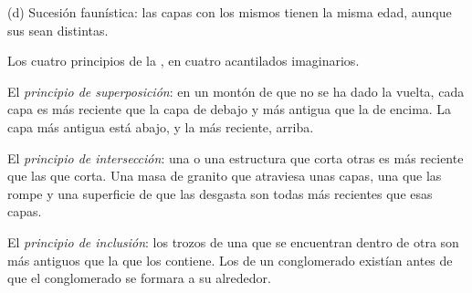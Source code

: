 \begin{omfigure}
\begin{minipage}[t]{0.49\linewidth}
{\small (d) Sucesión faunística: las capas con los mismos  tienen la
misma edad, aunque sus  sean distintas.}
\end{minipage}

\medskip
{\small Los cuatro principios de la , en cuatro acantilados
imaginarios.}
\label{fig:g7:geological-time:principles}
\end{omfigure}

\begin{definition}\label{def:g7:geological-time:superposition}
El \emph{principio de superposición}:
en un montón de  que no se ha dado la vuelta, cada
capa es más reciente que la capa de debajo y más antigua que la de encima.
La capa más antigua está abajo, y la más reciente, arriba.
\end{definition}

\begin{definition}\label{def:g7:geological-time:cross-cutting}
El \emph{principio de intersección}: una  o una estructura que corta otras 
es más reciente que las  que corta. Una masa de granito que atraviesa
unas capas, una  que las rompe y una superficie de  que las
desgasta son todas más recientes que esas capas.
\end{definition}

\begin{definition}\label{def:g7:geological-time:inclusion}
El \emph{principio de inclusión}: los trozos de
una  que se encuentran dentro de otra  son más antiguos que la
 que los contiene. Los  de un conglomerado existían antes de que
el conglomerado se formara a su alrededor.
\end{definition}

